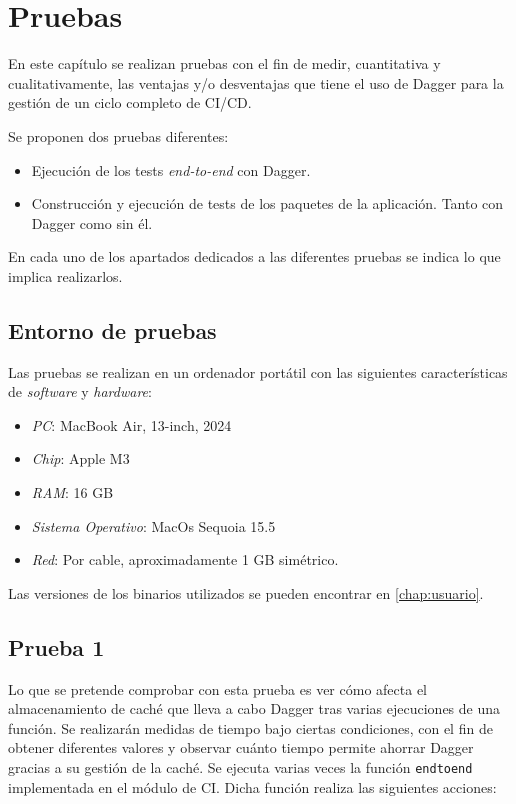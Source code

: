 \chapter{Pruebas}
\label{chap:pruebas}

En este capítulo se realizan pruebas con el fin de medir, cuantitativa y cualitativamente, las ventajas y/o desventajas que tiene el uso de Dagger para la gestión de un ciclo completo de CI/CD.

Se proponen dos pruebas diferentes:

\begin{itemize}
  \item Ejecución de los tests \textit{end-to-end} con Dagger.
  \item Construcción y ejecución de tests de los paquetes de la aplicación. Tanto con Dagger como sin él.
\end{itemize}

En cada uno de los apartados dedicados a las diferentes pruebas se indica lo que implica realizarlos.

\section{Entorno de pruebas}

Las pruebas se realizan en un ordenador portátil con las siguientes características de \textit{software} y \textit{hardware}:

\begin{itemize}
  \item \textit{PC}: MacBook Air, 13-inch, 2024
  \item \textit{Chip}: Apple M3
  \item \textit{RAM}: 16 GB
  \item \textit{Sistema Operativo}: MacOs Sequoia 15.5
  \item \textit{Red}: Por cable, aproximadamente 1 GB simétrico.
\end{itemize}

Las versiones de los binarios utilizados se pueden encontrar en \ref{chap:usuario}.

\section{Prueba 1}

Lo que se pretende comprobar con esta prueba es ver cómo afecta el almacenamiento de caché que lleva a cabo Dagger tras varias ejecuciones de una función. Se realizarán medidas de tiempo bajo ciertas condiciones, con el fin de obtener diferentes valores y observar cuánto tiempo permite ahorrar Dagger gracias a su gestión de la caché. Se ejecuta varias veces la función \texttt{endtoend} implementada en el módulo de CI. Dicha función realiza las siguientes acciones:

